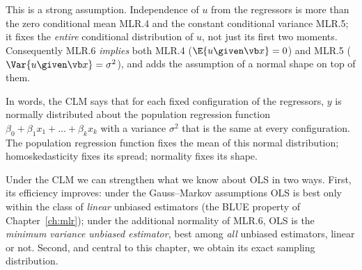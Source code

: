 
This is a strong assumption. Independence of $u$ from the regressors is more than the zero conditional mean MLR.4 and the constant conditional variance MLR.5; it fixes the \emph{entire} conditional distribution of $u$, not just its first two moments. Consequently MLR.6 \emph{implies} both MLR.4 ($\E{u\given \vb x}=0$) and MLR.5 ($\Var{u\given \vb x}=\sigma^2$), and adds the assumption of a normal shape on top of them.


In words, the CLM says that for each fixed configuration of the regressors, $y$ is normally distributed about the population regression function $\beta_0+\beta_1 x_1+\dots+\beta_k x_k$ with a variance $\sigma^2$ that is the same at every configuration. The population regression function fixes the mean of this normal distribution; homoskedasticity fixes its spread; normality fixes its shape.


Under the CLM we can strengthen what we know about OLS in two ways. First, its efficiency improves: under the Gauss--Markov assumptions OLS is best only within the class of \emph{linear} unbiased estimators (the BLUE property of Chapter~\ref{ch:mlr}); under the additional normality of MLR.6, OLS is the \emph{minimum variance unbiased estimator}, best among \emph{all} unbiased estimators, linear or not. Second, and central to this chapter, we obtain its exact sampling distribution.


